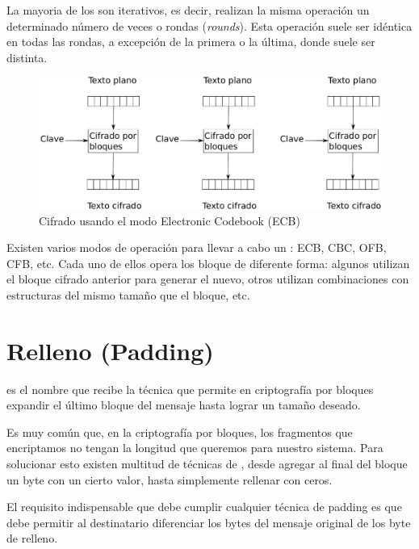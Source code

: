 La mayoria de los  son iterativos, es decir, realizan la misma operación un determinado número de veces o rondas (\emph{rounds}).
Esta operación suele ser idéntica en todas las rondas, a excepción de la primera o la última, donde suele ser distinta.

\begin{figure}[ht]
  \centering
  \includegraphics[scale=0.5]{Figures/ECB}
  \decoRule
  \caption[Electronic Codebook (ECB)]{Cifrado usando el modo Electronic Codebook (ECB)}
  \label{fig:ECB}
\end{figure}

Existen varios modos de operación para llevar a cabo un : ECB, CBC, OFB, CFB, etc.
Cada uno de ellos opera los bloque de diferente forma: algunos utilizan el bloque cifrado anterior para generar el nuevo,
otros utilizan combinaciones con estructuras del mismo tamaño que el bloque, etc. \emph{\parencite{Reference21}}


\section{Relleno (Padding)}

 es el nombre que recibe la técnica que permite en criptografía por bloques expandir el último bloque del mensaje hasta lograr un tamaño deseado.

Es muy común que, en la criptografía por bloques, los fragmentos que encriptamos no tengan la longitud que queremos para nuestro sistema.
Para solucionar esto existen multitud de técnicas de , desde agregar al final del bloque un byte con un cierto valor, hasta simplemente rellenar con ceros.

El requisito indispensable que debe cumplir cualquier técnica de padding es que debe permitir al destinatario diferenciar los bytes del mensaje original de los byte de relleno. \emph{\parencite{Reference8}}

